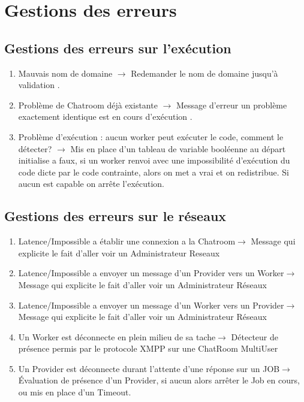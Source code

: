 \documentclass[11pt]{report}
\begin{document}
\section{Gestions des erreurs}

\subsection{Gestions des erreurs sur l\textquoteright exécution}
\begin{enumerate}
\item Mauvais nom de domaine $ \rightarrow $ Redemander le nom de domaine jusqu’à validation .
\item Problème de Chatroom déjà existante $\rightarrow$ Message d'erreur un problème exactement identique est en cours d’exécution .
\item Problème d’exécution : aucun worker peut exécuter le code, comment le détecter? $\rightarrow$ Mis en place d'un tableau de variable booléenne au départ initialise a faux, si un worker renvoi avec une impossibilité d\textquoteright exécution du code dicte par le code contrainte, alors on met a vrai et on redistribue. Si aucun est capable on arrête l\textquoteright exécution.
\end{enumerate}  
\subsection{Gestions des erreurs sur le réseaux}
\begin{enumerate}
\item Latence/Impossible a établir une  connexion a la Chatroom$ \rightarrow $ Message qui explicite le fait d’aller voir un Administrateur Reseaux
\item Latence/Impossible a envoyer un  message d'un Provider vers un Worker$ \rightarrow $ Message qui explicite le fait d’aller voir un Administrateur Réseaux
\item Latence/Impossible a envoyer un  message d'un Worker vers un Provider$ \rightarrow $ Message qui explicite le fait d’aller voir un Administrateur Réseaux 
\item Un Worker est déconnecte en plein milieu de sa tache$ \rightarrow $ Détecteur de présence permis par le protocole XMPP sur une ChatRoom MultiUser
\item Un Provider est déconnecte durant l'attente d'une réponse sur un JOB$ \rightarrow $ Évaluation de présence d'un Provider, si aucun alors arrêter le Job en cours, ou mis en place d'un Timeout.
\end{enumerate}
\end{document}
